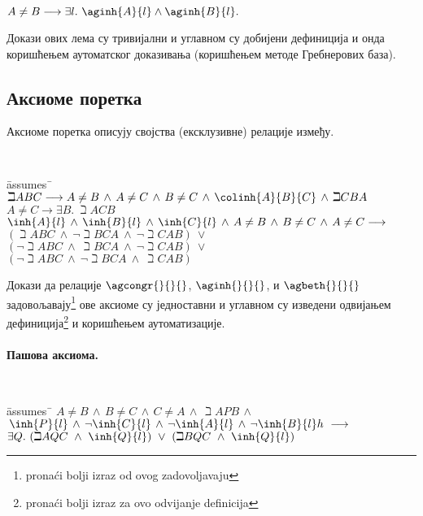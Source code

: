 \vspace{-3mm}
{\tt
\begin{tabbing}
$A \neq B \longrightarrow \exists l.\ \aginh{A}{l} \wedge
\aginh{B}{l}.$
\end{tabbing}
}

Докази ових лема су тривијални и углавном су добијени дефиниција и
онда коришћењем аутоматског доказивања (коришћењем методе Гребнерових
база).

\subsection{Аксиоме поретка}
Аксиоме поретка описују својства (ексклузивне) релације између.
{\tt
\begin{tabbing}
\hspace{5mm}\=assumes\ \=\kill
$\beth{A}{B}{C} \longrightarrow A \neq B\,\wedge\,A \neq C\,\wedge\,B \neq C\,\wedge\,\colinh{A}{B}{C}\,\wedge\,\beth{C}{B}{A}$\\
$A \neq C \longrightarrow \exists B.\ \beth{A}{C}{B}$\\
$\inh{A}{l}\,\wedge\,\inh{B}{l}\,\wedge\, \inh{C}{l}\,\wedge\,A \neq B\,\wedge\,B \neq C\,\wedge\,A \neq C \longrightarrow$\\
\> $(\beth{A}{B}{C}\ \wedge\ \neg \beth{B}{C}{A}\ \wedge\ \neg \beth{C}{A}{B}) \ \vee$ \\
\> $(\neg\beth{A}{B}{C}\ \wedge\ \beth{B}{C}{A}\ \wedge\  \neg \beth{C}{A}{B}) \ \vee$\\
\>$(\neg\beth{A}{B}{C}\ \wedge\ \neg \beth{B}{C}{A}\ \wedge\ \beth{C}{A}{B})$
\end{tabbing}
}

Докази да релације $\agcongr{}{}{}$, $\aginh{}{}{}$, и $\agbeth{}{}{}$
задовољавају\footnote{prona\'ci bolji izraz od ovog zadovoljavaju} ове
аксиоме су једноставни и углавном су изведени одвијањем
дефиниција\footnote{prona\'ci bolji izraz za ovo odvijanje definicija}
и коришћењем аутоматизације.

\paragraph{Пашова аксиома.}

{\tt
\begin{tabbing}
\hspace{5mm}\=assumes\ \=\kill
$A \neq B\,\wedge\,B \neq C\,\wedge\,C \neq A\,\wedge\,\beth{A}{P}{B}\,\wedge$\\
$\,\inh{P}{l}\,\wedge\,\neg \inh{C}{l}\,\wedge\,\neg \inh{A}{l}\,\wedge\,\neg \inh{B}{l}h\ \longrightarrow$\\
\>$\exists Q.\ (\beth{A}{Q}{C}\  \wedge\ \inh{Q}{l})\ \vee\
               (\beth{B}{Q}{C}\  \wedge\  \inh{Q}{l})$
\end{tabbing}
}

